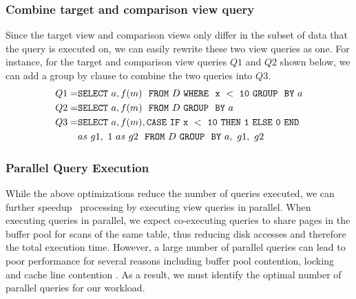 \subsubsection{Combine target and comparison view query}
\label{subsec:target_comparison_view}
Since the target view and comparison views only differ in the subset of data
that the query is executed on, we can easily rewrite these two view queries as
one. For instance, for the target and comparison view queries $Q1$ and $Q2$
shown below, we can add a group by clause to combine the two queries into $Q3$.
\begin{align*} 
Q1 = &{\tt SELECT \ } a, f(m) \ \ {\tt FROM} \  D\  {\tt WHERE \ \ x\ <\ 10\
GROUP \ \ BY} \ a \\
Q2 = &{\tt SELECT \ } a, f(m) \ \ {\tt FROM} \  D\  {\tt GROUP \ \ BY} \ a \\
Q3 = &{\tt SELECT \ } a, f(m), {\tt CASE\ IF\ x\ <\ 10\ THEN\ 1\ ELSE\ 0\
END}\\ 
&as\ g1,\ 1\ as\ g2 \ \ {\tt FROM} \ D\ {\tt GROUP \ \ BY} \ a,\ g1,\ g2
\end{align*}

  \subsubsection {Parallel Query Execution}
  \label{subsec:parallel_exec}
  While the above optimizations reduce the number of queries executed, we can
  further speedup \SeeDB\ processing by executing view queries in parallel. When
  executing queries in parallel, we expect co-executing queries to share pages in the
  buffer pool for scans of the same table, thus reducing disk accesses and
  therefore the total execution time. 
  However, a large number of parallel queries can lead to poor performance for
  several reasons including buffer pool contention, locking and cache line
  contention \cite{Postgres_wiki}. 
  As a result, we must identify the optimal number of parallel queries for our workload.
  
